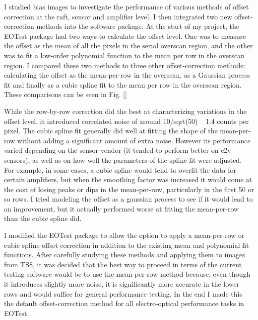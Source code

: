 I studied bias images to investigate the performance of various methods of offset correction at the raft, sensor and amplifier level. I then integrated two new offset-correction methods into the  software package. At the start of my project, the EOTest package had two ways to calculate the offset level. One was to measure the offset as the mean of all the pixels in the serial overscan region, and the other was to fit a low-order polynomial function to the mean per row in the overscan region. I compared these two methods to three other offset-correction methods: calculating the offset as the mean-per-row in the overscan, as a Gaussian process fit and finally as a cubic spline fit to the mean per row in the overscan region. These comparisons can be seen in Fig. []


 

While the row-by-row correction did the best at characterizing variations in the offset level, it introduced correlated noise of around 10/sqrt(50) ~ 1.4 counts per pixel. The cubic spline fit generally did well at fitting the shape of the mean-per-row without adding a significant amount of extra noise. However its performance varied depending on the sensor vendor (it tended to perform better on e2v sensors), as well as on how well the parameters of the spline fit were adjusted. For example, in some cases, a cubic spline would tend to overfit the data for certain amplifiers, but when the smoothing factor was increased it would come at the cost of losing peaks or dips in the mean-per-row, particularly in the first 50 or so rows. I tried modeling the offset as a gaussian process to see if it would lead to an improvement, but it actually performed worse at fitting the mean-per-row than the cubic spline did. 

I modified the EOTest package to allow the option to apply a mean-per-row or cubic spline offset correction in addition to the existing mean and polynomial fit functions. After carefully studying these methods and applying them to images from TS8, it was decided that the best way to proceed in terms of the current testing software would be to use the mean-per-row method because, even though it introduces slightly more noise, it is significantly more accurate in the lower rows and would suffice for general performance testing. In the end I made this the default offset-correction method for all electro-optical performance tasks in EOTest.

